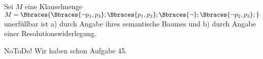 
\begin{exercise}[46]

Sei $M$ eine Klauselmenge $M = \Bbraces{\Bbraces{\neg p_1, p_3}; \Bbraces{p_1, p_2}; \Bbraces{\neg}; \Bbraces{\neg p_2, p_3};}$ unerfüllbar ist
a) durch Angabe ihres semantische Baumes und
b) durch Angabe einer Resolutionswiderlegung.

\end{exercise}


\begin{solution}

NoToDo!
Wir haben schon Aufgabe 45.

\end{solution}

